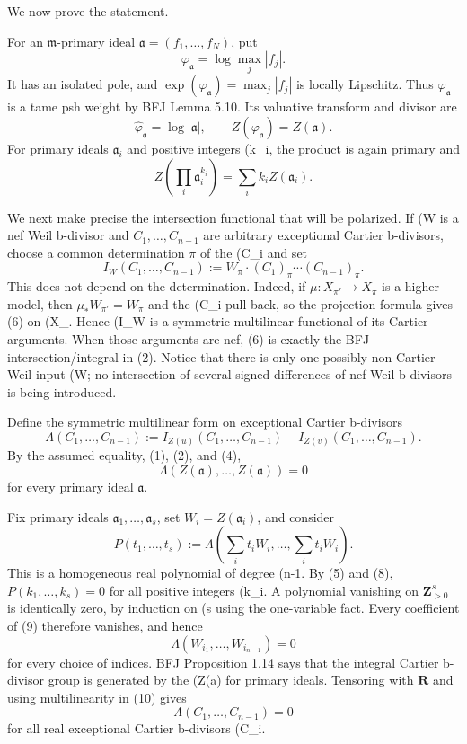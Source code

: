 We now prove the statement.

For an \(\mathfrak m\)-primary ideal
\(\mathfrak a=(f_1,\ldots,f_N)\), put
\[
                    \varphi_{\mathfrak a}=\log\max_j|f_j|.
\tag{3}
\]
It has an isolated pole, and
\(\exp(\varphi_{\mathfrak a})=\max_j|f_j|\) is locally Lipschitz.  Thus
\(\varphi_{\mathfrak a}\) is a tame psh weight by BFJ Lemma 5.10.  Its
valuative transform and divisor are
\[
 \widehat\varphi_{\mathfrak a}=\log|\mathfrak a|,
 \qquad Z(\varphi_{\mathfrak a})=Z(\mathfrak a).
\tag{4}
\]
For primary ideals \(\mathfrak a_i\) and positive integers (k_i\), the
product is again primary and
\[
 Z\!\left(\prod_i\mathfrak a_i^{k_i}\right)
                         =\sum_i k_iZ(\mathfrak a_i).
\tag{5}
\]

We next make precise the intersection functional that will be polarized.
If (W\) is a nef Weil b-divisor and
\(C_1,\ldots,C_{n-1}\) are arbitrary exceptional Cartier b-divisors, choose
a common determination \(\pi\) of the (C_i\) and set
\[
 I_W(C_1,\ldots,C_{n-1})
 :=W_\pi\cdot(C_1)_\pi\cdots(C_{n-1})_\pi.
\tag{6}
\]
This does not depend on the determination.  Indeed, if
\(\mu:X_{\pi'}\to X_\pi\) is a higher model, then
\(\mu_*W_{\pi'}=W_\pi\) and the (C_i\) pull back, so the projection
formula gives (6) on (X_\pi\).  Hence (I_W\) is a symmetric multilinear
functional of its Cartier arguments.  When those arguments are nef, (6)
is exactly the BFJ intersection/integral in (2).  Notice that there is only
one possibly non-Cartier Weil input (W\); no intersection of several
signed differences of nef Weil b-divisors is being introduced.

Define the symmetric multilinear form on exceptional Cartier b-divisors
\[
 \Lambda(C_1,\ldots,C_{n-1})
 :=I_{Z(u)}(C_1,\ldots,C_{n-1})
  -I_{Z(v)}(C_1,\ldots,C_{n-1}).
\tag{7}
\]
By the assumed equality, (1), (2), and (4),
\[
 \Lambda(Z(\mathfrak a),\ldots,Z(\mathfrak a))=0
\tag{8}
\]
for every primary ideal \(\mathfrak a\).

Fix primary ideals \(\mathfrak a_1,\ldots,\mathfrak a_s\), set
\(W_i=Z(\mathfrak a_i)\), and consider
\[
 P(t_1,\ldots,t_s)
 :=\Lambda\!\left(\sum_i t_iW_i,\ldots,\sum_i t_iW_i\right).
\tag{9}
\]
This is a homogeneous real polynomial of degree (n-1\).  By (5) and (8),
\(P(k_1,\ldots,k_s)=0\) for all positive integers (k_i\).  A polynomial
vanishing on \(\mathbf Z_{>0}^s\) is identically zero, by induction on (s\)
using the one-variable fact.  Every coefficient of (9) therefore vanishes,
and hence
\[
 \Lambda(W_{i_1},\ldots,W_{i_{n-1}})=0
\tag{10}
\]
for every choice of indices.  BFJ Proposition 1.14 says that the integral
Cartier b-divisor group is generated by the (Z(\mathfrak a)\) for primary
ideals.  Tensoring with \(\mathbf R\) and using multilinearity in (10) gives
\[
             \Lambda(C_1,\ldots,C_{n-1})=0
\tag{11}
\]
for all real exceptional Cartier b-divisors (C_i\).


